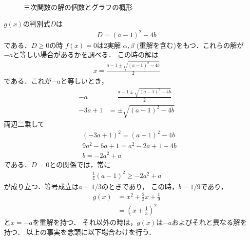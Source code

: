 \documentclass[a4paper,10pt]{ltjsarticle}
\begin{document}
\begin{multicols}{2}
\begin{figure}[H]
\begin{subcaptionblock}{0.5\linewidth}
    \end{subcaptionblock}
    \caption{三次関数の解の個数とグラフの概形}
    \label{fig:1}
  \end{figure}

  $g(x)$の判別式$D$は
  \begin{align*}
    D=(a-1)^2-4b
  \end{align*}
  である．$D\ge0$の時 $f(x)=0$は2実解 $\alpha, \beta$ (重解を含む)をもつ．これらの解が$-a$と等しい場合があるかを調べる．
  この時の解は
  \begin{align}
    x = \frac{a-1 \pm \sqrt{(a-1)^2-4b}}{2}\label{eq:2}
  \end{align}
  である．これが$-a$と等しいとき，
  \begin{align*}
    -a      & = \frac{a-1 \pm \sqrt{(a-1)^2-4b}}{2} \\
    -3a + 1 & = \pm \sqrt{(a-1)^2-4b}
  \end{align*}
  両辺二乗して
  \begin{align}
     & (-3a+1)^2 = (a-1)^2-4b   \nonumber \\
     & 9a^2-6a+1 = a^2-2a+1 -4b \nonumber \\
     & b = - 2a^2+a \label{eq:3}
  \end{align}
  である．$D=0$との関係では，常に
  \begin{align*}
    \frac{1}{4}(a-1)^2 \ge -2a^2+a
  \end{align*}
  が成り立つ．等号成立は$a=1/3$のときであり，
  この時，$b=1/9$であり，
  \begin{align*}
    g(x)
     & = x^2+\frac{2}{3}x+\frac{1}{9} \\
     & = \left(x+\frac{1}{3}\right)^2
  \end{align*}
  と$x=-a$を重解を持つ．
  それ以外の時は，$g(x)$は$-a$およびそれと異なる解を持つ．
  以上の事実を念頭に以下場合わけを行う．


\end{multicols}
\end{document}
